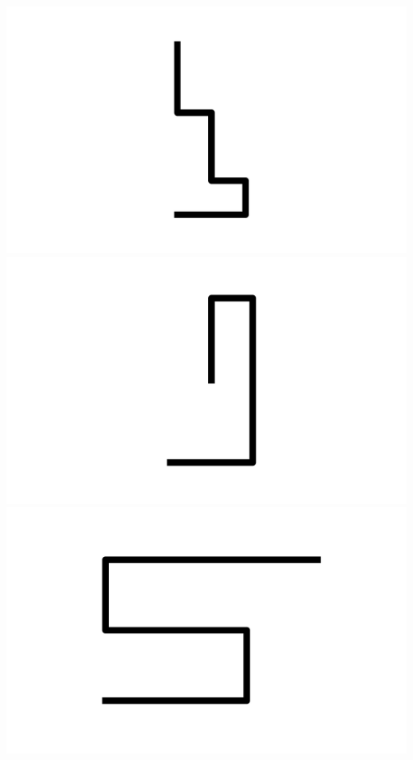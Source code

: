 \documentclass[]{report}
\begin{document}
\includegraphics[scale=.1]{pictures/21/state_cluster_shapes_37.pdf} 
\includegraphics[scale=.1]{pictures/21/state_cluster_shapes_38.pdf} 
\includegraphics[scale=.1]{pictures/21/state_cluster_shapes_39.pdf} 
\end{document}

